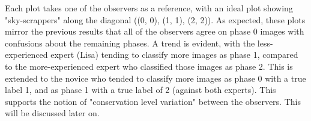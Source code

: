 \documentclass[a4paper]{article}
\begin{document}
        \newpage
        Each plot takes one of the observers as a reference, with an ideal plot showing "sky-scrappers" along the diagonal ((0, 0), (1, 1), (2, 2)). As expected, these plots mirror the previous results that all of the observers agree on phase 0 images with confusions about the remaining phases. A trend is evident, with the less-experienced expert (Lisa) tending to classify more images as phase 1, compared to the more-experienced expert who classified those images as phase 2. This is extended to the novice who tended to classify more images as phase 0 with a true label 1, and as phase 1 with a true label of 2 (against both experts). This supports the notion of "conservation level variation" between the observers. This will be discussed later on.
        \vspace{3mm}
\end{document}
